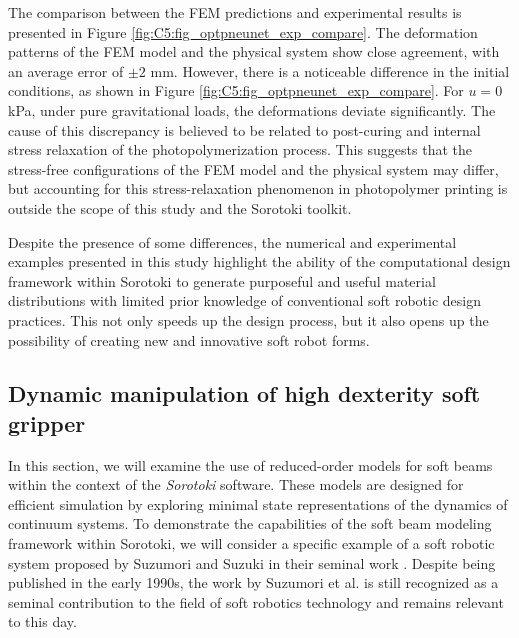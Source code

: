 The comparison between the FEM predictions and experimental results is presented in Figure \ref{fig:C5:fig_optpneunet_exp_compare}. The deformation patterns of the FEM model and the physical system show close agreement, with an average error of $\pm 2$ \si{\milli \meter}. However, there is a noticeable difference in the initial conditions, as shown in Figure \ref{fig:C5:fig_optpneunet_exp_compare}. For $u = 0$ \si{\kilo \pascal}, under pure gravitational loads, the deformations deviate significantly. The cause of this discrepancy is believed to be related to post-curing and internal stress relaxation of the photopolymerization process. This suggests that the stress-free configurations of the FEM model and the physical system may differ, but accounting for this stress-relaxation phenomenon in photopolymer printing is outside the scope of this study and the Sorotoki toolkit.

Despite the presence of some differences, the numerical and experimental examples presented in this study highlight the ability of the computational design framework within Sorotoki to generate purposeful and useful material distributions with limited prior knowledge of conventional soft robotic design practices. This not only speeds up the design process, but it also opens up the possibility of creating new and innovative soft robot forms.

\subsection{Dynamic manipulation of high dexterity soft gripper}
\label{sec:C5:suzumori_gripper}
In this section, we will examine the use of reduced-order models for soft beams within the context of the \textit{Sorotoki} software. These models are designed for efficient simulation by exploring minimal state representations of the dynamics of continuum systems. To demonstrate the capabilities of the soft beam modeling framework within Sorotoki, we will consider a specific example of a soft robotic system proposed by Suzumori and Suzuki in their seminal work \cite{Suzumori1991,Suzumori1992}. Despite being published in the early 1990s, the work by Suzumori et al. is still recognized as a seminal contribution to the field of soft robotics technology and remains relevant to this day.

